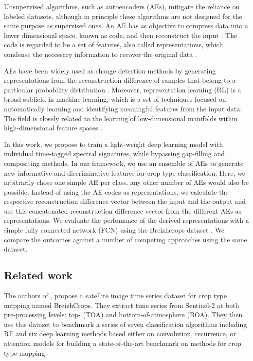 \documentclass[journal,article,submit,pdftex,moreauthors]{Definitions/mdpi}
\begin{document}
Unsupervised algorithms, such as autoencoders (AEs), mitigate the reliance on labeled datasets, although in principle these algorithms 
are not designed for the same purpose as supervised ones. An AE has as objective to compress data into a lower dimensional 
space, known as code, and then reconstruct the input \cite{ML2023}.  The code is regarded to be a set of features, also called representations, 
which condense the necessary information to recover the original data \cite{LopezPinaya2020}.

AEs have been widely used as change detection methods by generating representations from the reconstruction difference of 
samples that belong to a particular probability distribution \cite{LopezFandino2018,Luppino2024,Kalinicheva2019}. 
Moreover, representation learning (RL) is a broad subfield in machine learning, which is a set of techniques focused on 
automatically learning and identifying meaningful features from the input data. The field is closely related to the learning of low-dimensional manifolds within high-dimensional feature spaces
\cite{Swope2021, Bengio2013, Neumann2019, Li2022, Bengio2012, Engelen2019, Ericsson2022}.

In this work, we propose to train a light-weight deep learning model with individual time-tagged spectral signatures, while bypassing gap-filling and compositing methods.
In our framework, we use an ensemble of AEs to generate new informative and discriminative features for crop type classification. 
Here, we arbitrarily chose one simple AE per class, any other number of AEs would also be possible.
Instead of using the AE codes as representations, we calculate the respective reconstruction difference vector between the input and the output and use this concatenated reconstruction difference vector from the different AEs as representations. 
We evaluate the perfomance of the derived representations with a simple fully connected network (FCN) using the Breizhcrops dataset \cite{Russwurm2020}. 
We compare the outcomes against a number of competing approaches using the same dataset.


\subsection{Related work}
The authors of \cite{Russwurm2020}, propose a satellite image time series dataset for crop type mapping named BreizhCrops. 
They extract time series from Sentinel-2 at both pre-processing levels: top- (TOA) and bottom-of-atmosphere (BOA). 
They then use this dataset to benchmark a series of seven classification algorithms including RF and six deep learning 
methods based either on convolution, recurrence, or attention models for building a state-of-the-art benchmark on methods 
for crop type mapping.
\end{document}

